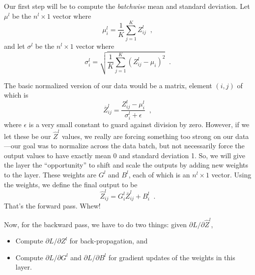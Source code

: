 Our first step will be to compute the {\em batchwise} mean and
standard deviation.  Let $\mu^l$ be the $n^l \times 1$ vector where
\[\mu^l_i = \frac{1}{K} \sum_{j = 1}^K Z^l_{ij}\;\;,\]
and let $\sigma^l$ be the $n^l \times 1$ vector where
\[\sigma^l_i = \sqrt{\frac{1}{K} \sum_{j = 1}^K (Z^l_{ij} - \mu_i)^2}\;\;.\]

The basic normalized version of our data would be a matrix,
element $(i, j)$ of which is
\[\overline{Z}^l_{ij} = \frac{Z^l_{ij} - \mu^l_i}{\sigma^l_i + \epsilon}\;\;,\]
where $\epsilon$ is a very small constant to guard against division by
zero.
However, if we let these be our $\widehat{Z}^l$ values, we really are
forcing something too strong on our data---our goal was to normalize
across the data batch, but not necessarily force the output values to
have exactly mean 0 and standard deviation 1.  So, we will give the
layer the ``opportunity'' to shift and scale the outputs by adding new
weights to the layer.  These weights are $G^l$ and $B^l$, each of
which is an $n^l \times 1$ vector.  Using the weights, we define the
final output to be
\[\widehat{Z}^l_{ij} = G^l_i \overline{Z}^l_{ij} + B^l_i\;\;.\]
That's the forward pass.  Whew!

Now, for the backward pass, we have to do two things:  given
$\partial L / \partial \widehat{Z}^l$,
\begin{itemize}
  \item Compute $\partial L / \partial Z^l$ for back-propagation, and
  \item Compute $\partial L / \partial G^l$ and $\partial L / \partial
          B^l$ for gradient updates of the weights in this layer.
\end{itemize}

